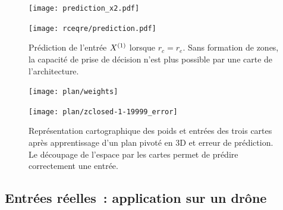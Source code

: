\documentclass[../main]{subfiles}
\begin{document}
\begin{figure}
	\texttt{[image: prediction\_x2.pdf]}
	\caption{\label{fig:pred_cercle}}
\end{figure}

\begin{figure}
	\texttt{[image: rceqre/prediction.pdf]}
	\caption{Prédiction de l'entrée $X^{({1})}$ lorsque $r_c = r_e$. Sans formation de zones, la capacité de prise de décision n'est plus possible par une carte de l'architecture. \label{fig:rcre_pred}}
\end{figure}



\begin{figure}
	\begin{minipage}{0.48\textwidth}
	\centering\texttt{[image: plan/weights]}
	\end{minipage}
	\begin{minipage}{0.48\textwidth}
	\texttt{[image: plan/zclosed-1-19999\_error]}	
	\end{minipage}	
	\caption{Représentation cartographique des poids et entrées des trois cartes après apprentissage d'un plan pivoté en 3D et erreur de prédiction. Le découpage de l'espace par les cartes permet de prédire correctement une entrée. \label{fig:plan3}}
	\end{figure}


\subsection{Entrées réelles~: application sur un drône}
\end{document}
